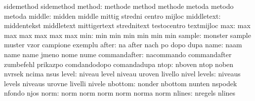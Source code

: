                            sidemethod                sidemethod
                   method: methode                   method
                           methode                   metoda
                           metodo                    metoda
                   middle: midden                    middle
                           mittig                    stredni
                           centro                    mijloc %
               middletext: middentekst               middletext
                           mittigertext              strednitext
                           testocentro               textmijloc %
                      max: max                       max
                           max                       max
                           max                       max
                      min: min                       min
                           min                       min
                           min                       min
                   sample: monster                   sample
                           muster                    vzor
                           campione                  exemplu
                    after: na                        after
                           nach                      po
                           dopo                      dupa
                     name: naam                      name
                           name                      jmeno
                           nome                      nume
             commandafter: nacommando                commandafter
                           zumbefehl                 prikazpo
                           comdandodopo              comandadupa
                     ntop: nboven                    ntop
                           noben                     nvrsek
                           ncima                     nsus
                    level: niveau                    level
                           niveau                    uroven
                           livello                   nivel
                   levels: niveaus                   levels
                           niveaus                   urovne
                           livelli                   nivele
                  nbottom: nonder                    nbottom
                           nunten                    nspodek
                           nfondo                    njos
                     norm: norm                      norm
                           norm                      norm
                           norma                     norm
                   nlines: nregels                   nlines
